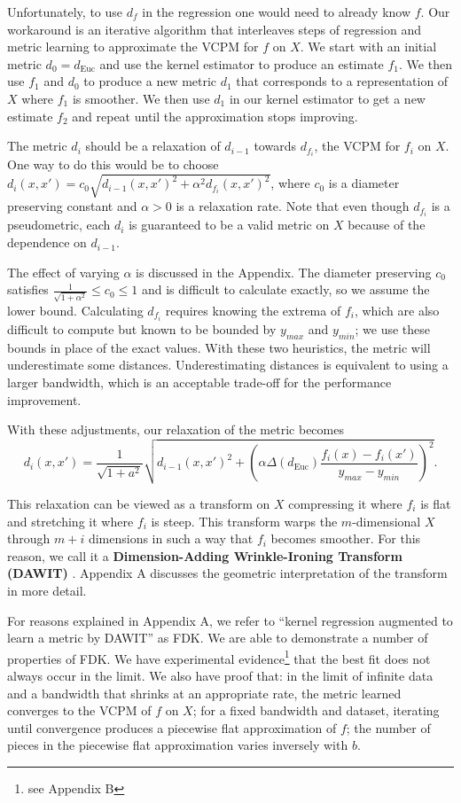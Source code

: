 \documentclass{article} %
\begin{document}
Unfortunately, to use $d_f$ in the regression one would need to already know $f$.
Our workaround is an iterative algorithm that interleaves steps of regression
and metric learning to approximate the VCPM for $f$ on $X$.
We start with an initial metric $d_0 = d_{\mathrm{Euc}}$ and use the kernel estimator to
produce an estimate $f_1$.
We then use $f_1$ and $d_0$ to produce a new metric $d_1$ that corresponds
to a representation of $X$ where $f_1$ is smoother.
We then use $d_1$ in our kernel estimator to get a new estimate $f_2$ and repeat until
the approximation stops improving.

The metric $d_i$ should be a relaxation of $d_{i-1}$ towards $d_{f_i}$,
the VCPM for $f_i$ on $X$.
One way to do this would be to choose
$d_i(x,x') = c_0\sqrt{d_{i-1}(x,x')^2 + \alpha^2d_{f_i}(x,x')^2}$,
where $c_0$ is a diameter preserving constant and $\alpha > 0$ is a relaxation rate.
Note that even though $d_{f_i}$ is a pseudometric, each $d_i$ is guaranteed to
be a valid metric on $X$ because of the dependence on $d_{i-1}$.

The effect of varying $\alpha$ is discussed in the Appendix.
The diameter preserving $c_0$ satisfies $\frac{1}{\sqrt{1+\alpha^2}} \leq c_0 \leq 1$ and is difficult
to calculate exactly, so we assume the lower bound.
Calculating $d_{f_i}$ requires knowing the extrema of $f_i$, which are also difficult to compute
but known to be bounded by $y_{max}$ and $y_{min}$;
we use these bounds in place of the exact values.
With these two heuristics, the metric will underestimate some distances.
Underestimating distances is equivalent to using a larger bandwidth,
which is an acceptable trade-off for the performance improvement.

With these adjustments, our relaxation of the metric becomes
$$d_i(x,x') = \frac{1}{\sqrt{1+a^2}}\sqrt{d_{i-1}(x,x')^2 + \left(\alpha \Delta(d_{\mathrm{Euc}})
\frac{f_i(x) - f_i(x')}{y_{max}-y_{min}}\right)^2}.$$

This relaxation can be viewed as a transform on $X$
compressing it where $f_i$ is flat and stretching it where $f_i$ is steep.
This transform warps the $m$-dimensional $X$ through $m+i$ dimensions
in such a way that $f_i$ becomes smoother.
For this reason, we call it a \textbf{Dimension-Adding 
Wrinkle-Ironing Transform (DAWIT)} \cite{thesis}.
Appendix A discusses the geometric interpretation of the transform in more detail.

For reasons explained in Appendix A, we refer to  ``kernel regression
augmented to learn a metric by DAWIT'' as FDK.
We are able to demonstrate a number of properties of FDK.
We have experimental evidence\footnote{see Appendix B} that the best fit does not always occur
in the limit.
We also have proof that: in the limit of infinite data and a bandwidth that shrinks at an appropriate rate,
the metric learned converges to the VCPM of $f$ on $X$;
for a fixed bandwidth and dataset, iterating until convergence produces a piecewise flat
approximation of $f$;
the number of pieces in the piecewise flat approximation varies inversely with $b$.
\end{document}
